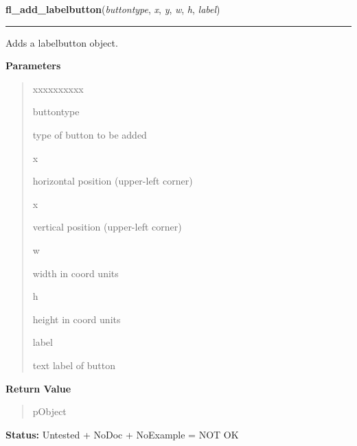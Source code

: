     \label{xformslib:library:fl_add_labelbutton}

    \vspace{0.5ex}

\hspace{.8\funcindent}\begin{boxedminipage}{\funcwidth}

    \raggedright \textbf{fl\_add\_labelbutton}(\textit{buttontype}, \textit{x}, \textit{y}, \textit{w}, \textit{h}, \textit{label})

    \vspace{-1.5ex}

    \rule{\textwidth}{0.5\fboxrule}
\setlength{\parskip}{2ex}
    Adds a labelbutton object.

\setlength{\parskip}{1ex}
      \textbf{Parameters}
      \vspace{-1ex}

      \begin{quote}
        \begin{Ventry}{xxxxxxxxxx}

          \item[buttontype]

          type of button to be added

          \item[x]

          horizontal position (upper-left corner)

          \item[x]

          vertical position (upper-left corner)

          \item[w]

          width in coord units

          \item[h]

          height in coord units

          \item[label]

          text label of button

        \end{Ventry}

      \end{quote}

      \textbf{Return Value}
    \vspace{-1ex}

      \begin{quote}
      pObject

      \end{quote}

\textbf{Status:} Untested + NoDoc + NoExample = NOT OK



    \end{boxedminipage}

